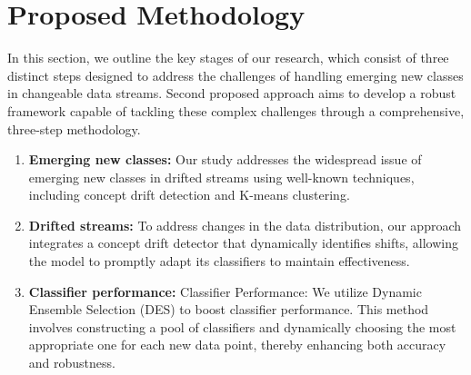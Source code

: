 
\section{Proposed Methodology}
\label{sec:proposed_methodology}
In this section, we outline the key stages of our research, which consist of three distinct steps designed to address the challenges of handling emerging new classes in changeable data streams. Second proposed approach aims to develop a robust framework capable of tackling these complex challenges through a comprehensive, three-step methodology.
\begin{enumerate}
	\item \textbf{Emerging new classes:} Our study addresses the widespread issue of emerging new classes in drifted streams using well-known techniques, including concept drift detection and K-means clustering.
	\item \textbf{Drifted streams:} To address changes in the data distribution, our approach integrates a concept drift detector that dynamically identifies shifts, allowing the model to promptly adapt its classifiers to maintain effectiveness.
	\item \textbf{Classifier performance:} Classifier Performance: We utilize Dynamic Ensemble Selection (DES) to boost classifier performance. This method involves constructing a pool of classifiers and dynamically choosing the most appropriate one for each new data point, thereby enhancing both accuracy and robustness.
\end{enumerate}
